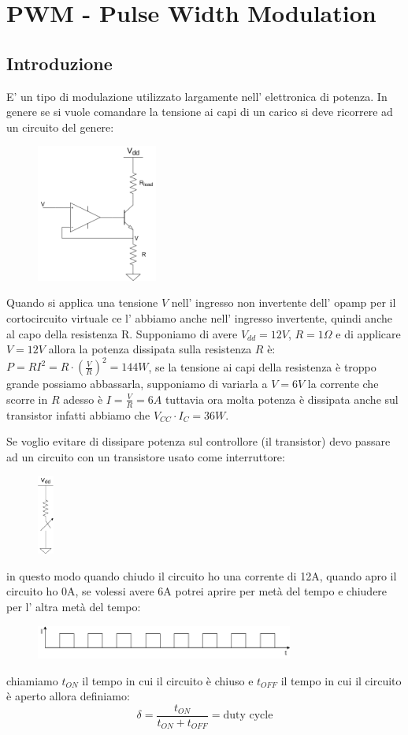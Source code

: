 \section{PWM - Pulse Width Modulation}
\subsection{Introduzione}
E' un tipo di modulazione utilizzato largamente nell' elettronica di potenza.
In genere se si vuole comandare la tensione ai capi di un carico si deve ricorrere ad un circuito del genere:
\begin{figure}[H]
    \centering
    \includegraphics[width=150px]{images/19_PWM/power_dimmer.png}
\end{figure}
Quando si applica una tensione $V$ nell' ingresso non invertente dell' opamp per il cortocircuito virtuale ce l' abbiamo anche nell' ingresso invertente, quindi anche al capo della resistenza R.
Supponiamo di avere $V_{dd} = 12V$, $R = 1 \Omega$ e di applicare $V = 12V$ allora la potenza dissipata sulla resistenza $R$ è: $P = RI^2 = R \cdot \left( \frac{V}{R} \right)^2 = 144W$, se la tensione ai capi della resistenza è troppo grande possiamo abbassarla, supponiamo di variarla a $V = 6V$ la corrente che scorre in $R$ adesso è $I = \frac{V}{R} = 6A$ tuttavia ora molta potenza è dissipata anche sul transistor infatti abbiamo che $V_{CC} \cdot I_C = 36W$.

Se voglio evitare di dissipare potenza sul controllore (il transistor) devo passare ad un circuito con un transistore usato come interruttore:
\begin{figure}[H]
    \centering
    \includegraphics[width=20px]{images/19_PWM/dimmer_with_switch.png}
\end{figure}
in questo modo quando chiudo il circuito ho una corrente di 12A, quando apro il circuito ho 0A, se volessi avere 6A potrei aprire per metà del tempo e chiudere per l' altra metà del tempo:
\begin{figure}[H]
    \centering
    \includegraphics[width=320px]{images/19_PWM/duty_cycle.png}
\end{figure}
chiamiamo $t_{ON}$ il tempo in cui il circuito è chiuso e $t_{OFF}$ il tempo in cui il circuito è aperto allora definiamo:
$$ \delta = \frac{t_{ON}}{t_{ON} + t_{OFF}} = \text{duty cycle} $$

